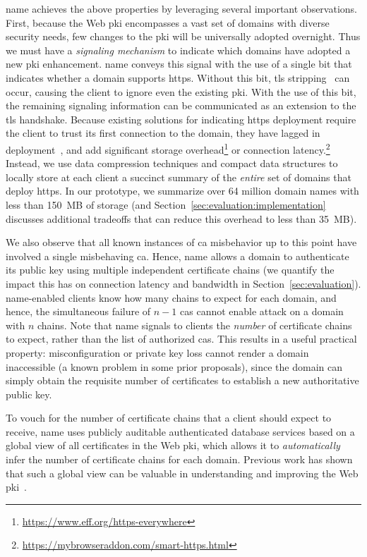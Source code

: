 \ac{name} achieves the above properties by leveraging several important observations.
First, because the Web \ac{pki} encompasses a vast set of domains with diverse
security needs, few changes to the \ac{pki} will be universally adopted
overnight. Thus we must have a \emph{signaling mechanism} to indicate which
domains have adopted a new \ac{pki} enhancement. \ac{name} conveys this signal
with the use of a single bit that indicates whether a domain supports
\ac{https}. Without this bit, \ac{tls} stripping~\cite{marlinspike2009new} can
occur, causing the client to ignore even the existing \ac{pki}. With the use of
this bit, the remaining signaling information can be communicated as an
extension to the \ac{tls} handshake. Because existing solutions for indicating
\ac{https} deployment require the client to trust its first connection to the
domain, they have lagged in deployment~\cite{rfc4033, rfc6698}, and add
significant storage overhead\footnote{\url{https://www.eff.org/https-everywhere}}
or connection
latency.\footnote{\url{https://mybrowseraddon.com/smart-https.html}} Instead, we
use data compression techniques and compact data structures to locally store at
each client a succinct summary of the \emph{entire} set of domains that deploy
\ac{https}.  In our prototype, we summarize over 64 million domain names with 
less than 150~MB of storage
(and Section~\ref{sec:evaluation:implementation} discusses additional tradeoffs 
that can reduce this overhead to less than 35~MB).

We also observe that all known instances of \ac{ca} misbehavior up to this point
have involved a single misbehaving \ac{ca}.  Hence, \ac{name} allows a domain to
authenticate its public key using multiple independent certificate chains (we
quantify the impact this has on connection latency and bandwidth in
Section~\ref{sec:evaluation}). \ac{name}-enabled clients know how many chains to
expect for each domain, and hence, the simultaneous failure of $n-1$ \acp{ca}
cannot enable  attack on a domain with $n$ chains. Note that \ac{name}
signals to clients the \emph{number} of certificate chains to expect, rather
than the list of authorized \acp{ca}.  This results in a useful practical
property: misconfiguration or private key loss cannot render a domain
inaccessible (a known problem in some prior proposals), 
since the domain can simply obtain the requisite number of
certificates to establish a new authoritative public key.

To vouch for the number of certificate chains that a client should expect to
receive, \ac{name} uses publicly auditable authenticated database services based
on a global view of all certificates in the Web \ac{pki}, which allows it to
\emph{automatically} infer the number of certificate chains for each domain.
Previous work has shown that such a global view can be valuable in understanding
and improving the Web \ac{pki}~\cite{durumeric2015search, larisch2017crlite}.

